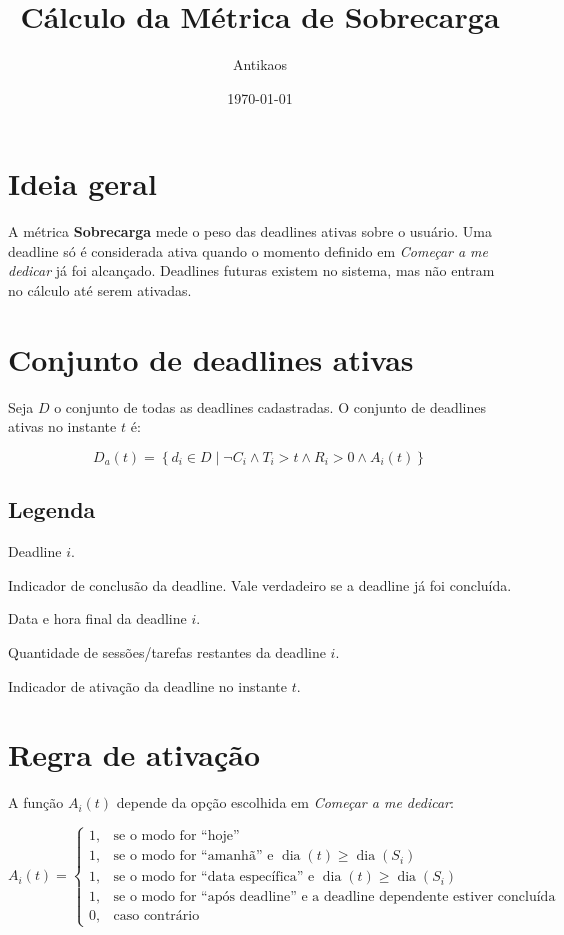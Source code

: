 \documentclass[12pt,a4paper]{article}
\title{Cálculo da Métrica de Sobrecarga}
\author{Antikaos}
\date{\today}
\begin{document}
\maketitle

\section{Ideia geral}

A métrica \textbf{Sobrecarga} mede o peso das deadlines ativas sobre o usuário. Uma deadline só é considerada ativa quando o momento definido em \textit{Começar a me dedicar} já foi alcançado. Deadlines futuras existem no sistema, mas não entram no cálculo até serem ativadas.

\section{Conjunto de deadlines ativas}

Seja $D$ o conjunto de todas as deadlines cadastradas. O conjunto de deadlines ativas no instante $t$ é:

\[
D_a(t) =
\left\{
d_i \in D \mid
\neg C_i
\land T_i > t
\land R_i > 0
\land A_i(t)
\right\}
\]

\subsection*{Legenda}

\begin{description}[leftmargin=2.2cm]
    \item[$d_i$] Deadline $i$.
    \item[$C_i$] Indicador de conclusão da deadline. Vale verdadeiro se a deadline já foi concluída.
    \item[$T_i$] Data e hora final da deadline $i$.
    \item[$R_i$] Quantidade de sessões/tarefas restantes da deadline $i$.
    \item[$A_i(t)$] Indicador de ativação da deadline no instante $t$.
\end{description}

\section{Regra de ativação}

A função $A_i(t)$ depende da opção escolhida em \textit{Começar a me dedicar}:

\[
A_i(t) =
\begin{cases}
1, & \text{se o modo for ``hoje''} \\
1, & \text{se o modo for ``amanhã'' e } \operatorname{dia}(t) \geq \operatorname{dia}(S_i) \\
1, & \text{se o modo for ``data específica'' e } \operatorname{dia}(t) \geq \operatorname{dia}(S_i) \\
1, & \text{se o modo for ``após deadline'' e a deadline dependente estiver concluída} \\
0, & \text{caso contrário}
\end{cases}
\]
\end{document}
